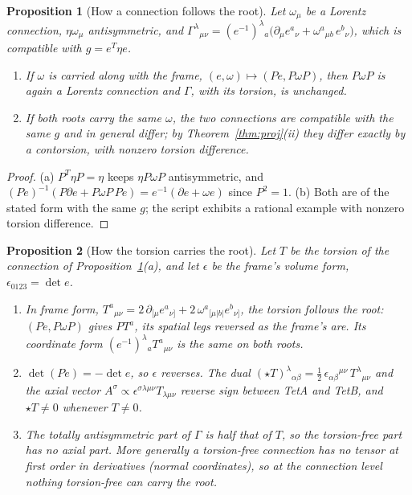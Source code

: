 \documentclass[twocolumn]{iopjournal}
\newtheorem{proposition}{Proposition}
\theoremstyle{definition}
\theoremstyle{remark}
\begin{document}
\begin{proposition}[How a connection follows the root]
\label{prop:follow}
Let $\omega_\mu$ be a Lorentz connection, $\eta\omega_\mu$
antisymmetric, and
$\Gamma^\lambda{}_{\mu\nu}
= (e^{-1})^\lambda{}_a\bigl(\partial_\mu e^a{}_\nu
+ \omega^a{}_{\mu b}\,e^b{}_\nu\bigr)$, which is compatible with
$g = e^T\eta e$.
\begin{enumerate}
\item[(a)] If $\omega$ is carried along with the frame,
  $(e,\omega) \mapsto (Pe, P\omega P)$, then $P\omega P$ is again a
  Lorentz connection and $\Gamma$, with its torsion, is unchanged.
\item[(b)] If both roots carry the same $\omega$, the two connections
  are compatible with the same $g$ and in general differ; by
  Theorem~\ref{thm:proj}(ii) they differ exactly by a contorsion,
  with nonzero torsion difference.
\end{enumerate}
\end{proposition}

\begin{proof}
(a) $P^T\eta P = \eta$ keeps $\eta P\omega P$ antisymmetric, and
$(Pe)^{-1}(P\partial e + P\omega P\,Pe) = e^{-1}(\partial e + \omega e)$
since $P^2 = 1$. (b) Both are of the stated form with the same $g$;
the script exhibits a rational example with nonzero torsion
difference.
\end{proof}

\begin{proposition}[How the torsion carries the root]
\label{prop:carry}
Let $T$ be the torsion of the connection of
Proposition~\ref{prop:follow}(a), and let $\epsilon$ be the frame's
volume form, $\epsilon_{0123} = \det e$.
\begin{enumerate}
\item[(i)] In frame form, $T^a{}_{\mu\nu} = 2\,\partial_{[\mu}e^a{}_{\nu]}
  + 2\,\omega^a{}_{[\mu|b|}e^b{}_{\nu]}$, the torsion follows the root:
  $(Pe, P\omega P)$ gives $PT^a$, its spatial legs reversed as the
  frame's are. Its coordinate form $(e^{-1})^\lambda{}_a T^a{}_{\mu\nu}$
  is the same on both roots.
\item[(ii)] $\det(Pe) = -\det e$, so $\epsilon$ reverses. The dual
  $(\star T)^\lambda{}_{\alpha\beta}
  = \tfrac12\,\epsilon_{\alpha\beta}{}^{\mu\nu}\,T^\lambda{}_{\mu\nu}$
  and the axial vector $A^\sigma \propto
  \epsilon^{\sigma\lambda\mu\nu}T_{\lambda\mu\nu}$ reverse sign between
  TetA and TetB, and $\star T \neq 0$ whenever $T \neq 0$.
\item[(iii)] The totally antisymmetric part of $\Gamma$ is half that
  of $T$, so the torsion-free part has no axial part. More generally a
  torsion-free connection has no tensor at first order in derivatives
  (normal coordinates), so at the connection level nothing torsion-free
  can carry the root.
\end{enumerate}
\end{proposition}
\end{document}

